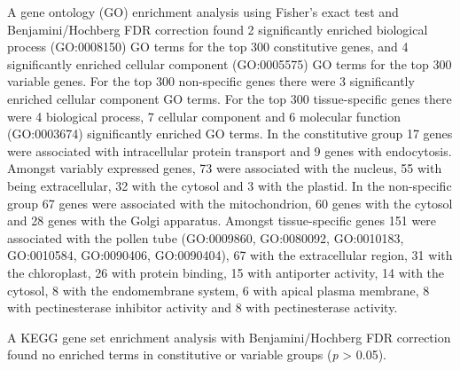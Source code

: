 \documentclass[../main.tex]{subfiles}
\begin{document}
A gene ontology (GO) enrichment analysis using Fisher's exact test \autocite{fisherInterpretationContingencyTables1922} and Benjamini/Hochberg FDR correction \autocite{benjaminiControllingFalseDiscovery1995} found 2 significantly enriched biological process (GO:0008150) GO terms for the top 300 constitutive genes, and 4 significantly enriched cellular component (GO:0005575) GO terms for the top 300 variable genes. For the top 300 non\hyp{}specific genes there were 3 significantly enriched cellular component GO terms. For the top 300 tissue\hyp{}specific genes there were 4 biological process, 7 cellular component and 6 molecular function (GO:0003674) significantly enriched GO terms.
In the constitutive group 17 genes were associated with intracellular protein transport and 9 genes with endocytosis.
Amongst variably expressed genes, 73 were associated with the nucleus, 55 with being extracellular, 32 with the cytosol and 3 with the plastid.
In the non\hyp{}specific group 67 genes were associated with the mitochondrion, 60 genes with the cytosol and 28 genes with the Golgi apparatus.
Amongst tissue\hyp{}specific genes 151 were associated with the pollen tube (GO:0009860, GO:0080092, GO:0010183, GO:0010584, GO:0090406, GO:0090404), 67 with the extracellular region,  31 with the chloroplast, 26 with protein binding, 15 with antiporter activity, 14 with the cytosol, 8 with the endomembrane system, 6 with apical plasma membrane,  8 with pectinesterase inhibitor activity and 8 with pectinesterase activity.

A KEGG gene set enrichment analysis with Benjamini/Hochberg FDR correction found no enriched terms in constitutive or variable groups (\textit{p} \textgreater{} 0.05).
\end{document}
